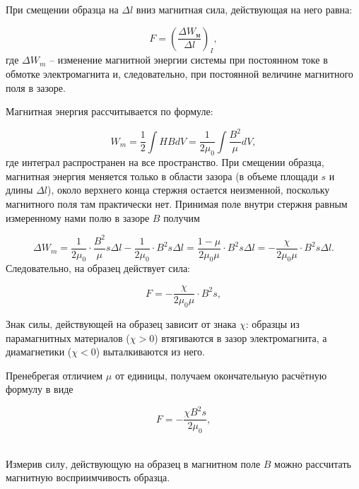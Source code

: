 \documentclass[a4paper,14pt]{article}
\begin{document}
При смещении образца на $\Delta l$ вниз магнитная сила, действующая на него равна:

\begin{equation}
	F = \left( \dfrac{\Delta W_{\text{м}}}{\Delta l}\right)_I,
\end{equation}
где $\Delta W_{m}$ -- изменение магнитной энергии системы при постоянном токе в обмотке электромагнита и, следовательно, при постоянной величине магнитного поля в зазоре.

Магнитная энергия рассчитывается по формуле:

\begin{equation}
	W_{m} =  \dfrac{1}{2} \int H B dV = \dfrac{1}{2\mu_0}  \int \dfrac{B^2}{\mu} dV,
\end{equation}
где интеграл распространен на все пространство. При смещении образца, магнитная энергия меняется только в области зазора (в объеме площади $s$ и длины $\Delta l$), около верхнего конца стержня остается неизменной, поскольку магнитного поля там практически нет. Принимая поле внутри стержня равным измеренному нами полю в зазоре $B$ получим

\begin{equation*}
    \Delta W_{m} = \dfrac{1}{2\mu_0}\cdot\dfrac{B^2}{\mu}s\Delta l - \dfrac{1}{2\mu_0}\cdot B^2 s\Delta l = \dfrac{1 - \mu}{2\mu_0 \mu}\cdot B^2 s\Delta l = -\dfrac{\chi}{2\mu_0 \mu}\cdot B^2 s\Delta l.
\end{equation*} 
Следовательно, на образец действует сила:

\begin{equation}
	F = -\dfrac{\chi}{2\mu_0 \mu}\cdot B^2 s, 
\end{equation}

Знак силы, действующей на образец зависит от знака $\chi$: образцы из парамагнитных материалов ($\chi > 0$) втягиваются в зазор электромагнита, а диамагнетики ($\chi < 0$) выталкиваются из него.

Пренебрегая отличием $\mu$ от единицы, получаем окончательную расчётную формулу в виде

\begin{equation}
F = -\dfrac{\chi B^2 s}{2\mu_0}, 
\end{equation}\

Измерив силу, действующую на образец в магнитном поле $B$ можно рассчитать магнитную восприимчивость образца.
\end{document}

